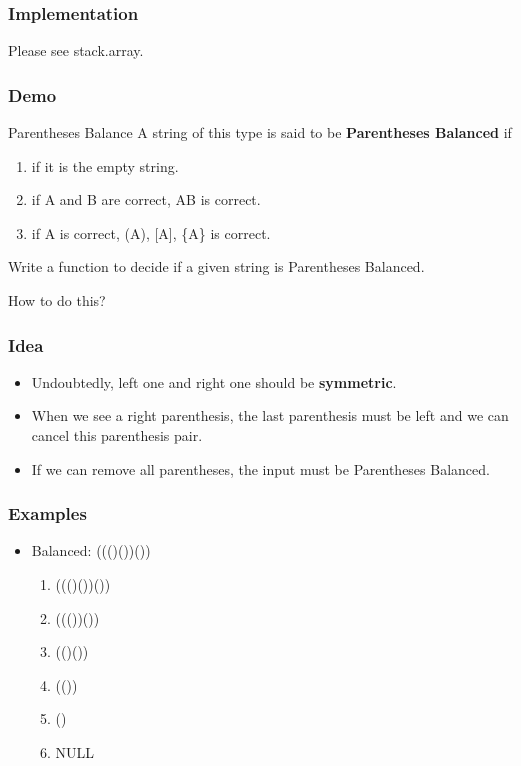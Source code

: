 \documentclass[11pt]{beamer}
\begin{document}
\begin{frame}
\frametitle{Implementation}
Please see stack.array.
\end{frame}

\begin{frame}
\frametitle{Demo}
\begin{block}{Parentheses Balance}
A string of this type is said to be {\bf\color{orange}Parentheses Balanced} if 
\begin{enumerate}
\item if it is the empty string.
\item if A and B are correct, AB is correct.
\item if A is correct, (A), [A], \{A\} is correct. 
\end{enumerate}
\end{block}
Write a function to decide if a given string is Parentheses Balanced.

How to do this?
\end{frame}

\begin{frame}
\frametitle{Idea}
\begin{itemize}
\item Undoubtedly, left one and right one should be {\color{red}\bf symmetric}.
\item When we see a right parenthesis, the last parenthesis must be left and we can cancel this parenthesis pair.
\item If we can remove all parentheses, the input must be Parentheses Balanced.
\end{itemize}
\end{frame}

\begin{frame}
\frametitle{Examples}
\begin{itemize}
\item Balanced: ((()())())
    \begin{enumerate}
    \item<2-> (({\color{red}()}())())
    \item<3-> (({\color{red}()})())
    \item<4-> ({\color{red}()}())
    \item<5-> ({\color{red}()})
    \item<6-> {\color{red}()}
    \item<7-> NULL
    \end{enumerate}
\end{itemize}
\end{frame}
\end{document}
